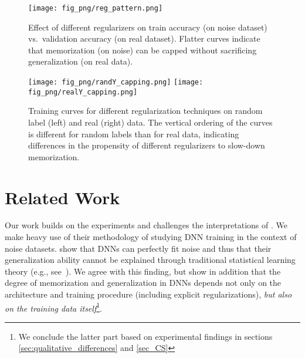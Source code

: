 \documentclass{article}
\begin{document}
    \begin{figure}[!t]
        \center
        \label{fig:reg_pattern}
        \texttt{[image: fig\_png/reg\_pattern.png]}
        \caption{Effect of different regularizers on train accuracy (on noise dataset) vs.~validation accuracy (on real dataset). Flatter curves indicate that memorization (on noise) can be capped without sacrificing generalization (on real data).}
    \end{figure}
    
    \begin{figure}[!t]
        \center
        \label{fig:randY_capping}
        \texttt{[image: fig\_png/randY\_capping.png]}
        \texttt{[image: fig\_png/realY\_capping.png]}
        \caption{Training curves for different regularization techniques on random label (left) and real (right) data.  The vertical ordering of the curves is different for random labels than for real data, indicating differences in the propensity of different regularizers to slow-down memorization.}
    \end{figure}


















\section{Related Work}

Our work builds on the experiments and challenges the interpretations of \citet{understanding_DL}.
We make heavy use of their methodology of studying DNN training in the context of noise datasets. \citet{understanding_DL} show that DNNs can perfectly fit noise and thus that their generalization ability cannot be explained through traditional statistical learning theory (e.g., see~\cite{vapnik1998statistical, bartlett2005local}). 
We agree with this finding, but show in addition that the degree of memorization and generalization in DNNs depends not only on the architecture and training procedure (including explicit regularizations), \textit{but also on the training data itself}\footnote{We conclude the latter part based on experimental findings in sections \ref{sec:qualitative_differences} and \ref{sec_CS}}. 
\end{document}
